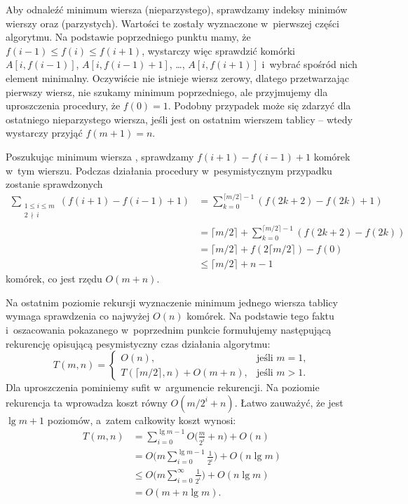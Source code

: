 \subproblem %
Aby odnaleźć minimum wiersza  (nieparzystego), sprawdzamy indeksy minimów wierszy  oraz  (parzystych).
Wartości te zostały wyznaczone w~pierwszej części algorytmu.
Na podstawie poprzedniego punktu mamy, że $f(i-1)\le f(i)\le f(i+1)$, wystarczy więc sprawdzić komórki $A[i,f(i-1)]$, $A[i,f(i-1)+1]$, \dots, $A[i,f(i+1)]$ i~wybrać spośród nich element minimalny.
Oczywiście nie istnieje wiersz zerowy, dlatego przetwarzając pierwszy wiersz, nie szukamy minimum poprzedniego, ale przyjmujemy dla uproszczenia procedury, że $f(0)=1$.
Podobny przypadek może się zdarzyć dla ostatniego nieparzystego wiersza, jeśli jest on ostatnim wierszem tablicy -- wtedy wystarczy przyjąć $f(m+1)=n$.

Poszukując minimum wiersza , sprawdzamy $f(i+1)-f(i-1)+1$ komórek w~tym wierszu.
Podczas działania procedury w~pesymistycznym przypadku zostanie sprawdzonych
\begin{align*}
	\sum_{\substack{1\le i\le m\\2\,\nmid\,i}}(f(i+1)-f(i-1)+1) &= \sum_{k=0}^{\lceil m/2\rceil-1}(f(2k+2)-f(2k)+1) \\[-4mm]
	&= \lceil m/2\rceil+\sum_{k=0}^{\lceil m/2\rceil-1}(f(2k+2)-f(2k)) \\[1mm]
	&= \lceil m/2\rceil+f(2\lceil m/2\rceil)-f(0) \\[2mm]
	&\le \lceil m/2\rceil+n-1
\end{align*}
komórek, co jest rzędu $O(m+n)$.

\subproblem %
Na ostatnim poziomie rekursji wyznaczenie minimum jednego wiersza tablicy wymaga sprawdzenia co najwyżej $O(n)$ komórek.
Na podstawie tego faktu i~oszacowania pokazanego w~poprzednim punkcie formułujemy następującą rekurencję opisującą pesymistyczny czas działania algorytmu:
\[
	T(m,n) =
	\begin{cases}
		O(n), & \text{jeśli $m=1$}, \\
		T(\lceil m/2\rceil,n)+O(m+n), & \text{jeśli $m>1$}.
	\end{cases}
\]
Dla uproszczenia pominiemy sufit w~argumencie rekurencji.
Na  poziomie rekurencja ta wprowadza koszt równy $O(m/2^i+n)$.
Łatwo zauważyć, że jest $\lg m+1$ poziomów, a~zatem całkowity koszt wynosi:
\begin{align*}
	T(m,n) &= \sum_{i=0}^{\lg m-1}O\biggl(\frac{m}{2^i}+n\biggr)+O(n) \\
	&= O\biggl(m\sum_{i=0}^{\lg m-1}\frac{1}{2^i}\biggr)+O(n\lg m) \\
	&\le O\biggl(m\sum_{i=0}^\infty\frac{1}{2^i}\biggr)+O(n\lg m) \\[1mm]
	&= O(m+n\lg m).
\end{align*}

\endinput
